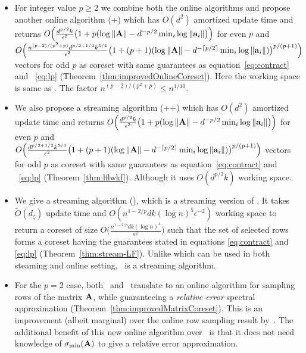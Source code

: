 \begin{itemize}
    \item For integer value $p \geq 2$ we combine both the online algorithms and propose another online algorithm (\online+) which has $O(d^2)$ amortized update time and returns $O\Big(\frac{d^{p/2}k}{\epsilon^{2}} \big(1+p(\log\|\mathbf{A}\| - d^{-p/2}\min_{i}\log\|\mathbf{a}_{i}\|\big)\Big)$ for even $p$ and $O\Big(\frac{n^{(p-2)/(p^{2}+p)}d^{p/2+1/4}k^{5/4}}{\epsilon^{2}}\big(1+(p+1)(\log\|\mathbf{A}\| - d^{-\lceil p/2 \rceil}\min_{i}\log\|\mathbf{a}_{i}\|)\big)^{p/(p+1)}\Big)$ vectors for odd $p$ as coreset with same guarantees as equation~\eqref{eq:contract} and ~\eqref{eq:lp} (Theorem~\ref{thm:improvedOnlineCoreset}). Here the working space is same as . The factor $n^{(p-2)/(p^{2}+p)} \leq n^{1/10}$. 
    \item We also propose a streaming algorithm (\online+\mrlw+) which has $O(d^2)$ amortized update time and returns $O\Big(\frac{d^{p/2}k}{\epsilon^{2}} \big(1+p(\log\|\mathbf{A}\| - d^{-p/2}\min_{i}\log\|\mathbf{a}_{i}\|\big)\Big)$ for even $p$ and $O\Big(\frac{d^{p/2+1/2}k^{5/4}}{\epsilon^{2}}\big(1+(p+1)(\log\|\mathbf{A}\| - d^{-\lceil p/2 \rceil}\min_{i}\log\|\mathbf{a}_{i}\|)\big)^{p/(p+1)}\Big)$ vectors for odd $p$ as coreset with same guarantees as equation~\eqref{eq:contract} and ~\eqref{eq:lp} (Theorem~\ref{thm:lflwkf}). Although it uses $O(d^{p/2}k)$ working space. 
    \item We give a streaming algorithm (\mrlf), which is a streaming version of \online. It takes $\tilde{O}(d_{\zeta})$ update time and $O(n^{1-2/p}dk(\log n)^{5}\epsilon^{-2})$ working space to return a coreset of size $O\big(\frac{n^{1-2/p} dk(\log n)^{4}}{\epsilon^{2}}\big)$ such that the set of selected rows forms a coreset having the guarantees stated in equations \eqref{eq:contract} and \eqref{eq:lp} (Theorem~\ref{thm:stream-LF}). Unlike \online which can be used in both steaming and online setting, \mrlf~is a streaming algorithm.
    \item For the $p=2$ case, both \online~and ~translate to an online algorithm for sampling rows of the matrix $\mathbf{A}$, while guaranteeing a {\em relative error} spectral approximation (Theorem~\ref{thm:improvedMatrixCoreset}). 
    This is an improvement (albeit marginal) over the online row sampling result by~\cite{cohen2016online}. The additional benefit of this new online algorithm over~\cite{cohen2016online} is that it does not need knowledge of $\sigma_{\min}(\mathbf{A})$ to give a relative error approximation. 
\end{itemize}
